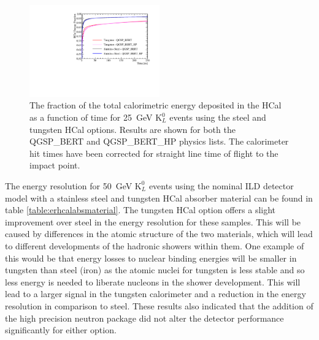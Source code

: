 \begin{figure}[h!]
\centering
\includegraphics[width=0.5\textwidth]{OptimisationStudies/Plots/Description/HCalAbsorberMaterialTimings.pdf}
\caption[The fraction of the total calorimetric energy deposited in the HCal as a function of time for 25~GeV $\text{K}^{0}_{L}$ events using the steel and tungsten HCal options.  Results are shown for both the QGSP\_BERT and QGSP\_BERT\_HP physics lists.  The calorimeter hit times have been corrected for straight line time of flight to the impact point.]{The fraction of the total calorimetric energy deposited in the HCal as a function of time for 25~GeV $\text{K}^{0}_{L}$ events using the steel and tungsten HCal options.  Results are shown for both the QGSP\_BERT and QGSP\_BERT\_HP physics lists.  The calorimeter hit times have been corrected for straight line time of flight to the impact point.}
\label{fig:hcalabsmaterialtiming}
\end{figure} 

The energy resolution for 50~GeV $\text{K}^{0}_{L}$ events using the nominal ILD detector model with a stainless steel and tungsten HCal absorber material can be found in table \ref{table:erhcalabsmaterial}.  The tungsten HCal option offers a slight improvement over steel in the energy resolution for these samples.  This will be caused by differences in the atomic structure of the two materials, which will lead to different developments of the hadronic showers within them.  One example of this would be that energy losses to nuclear binding energies will be smaller in tungsten than steel (iron) as the atomic nuclei for tungsten is less stable and so less energy is needed to liberate nucleons in the shower development.  This will lead to a larger signal in the tungsten calorimeter and a reduction in the energy resolution in comparison to steel.  These results also indicated that the addition of the high precision neutron package did not alter the detector performance significantly for either option.  

